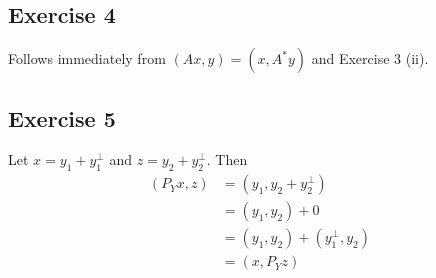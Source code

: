 \subsection{Exercise 4}
Follows immediately from $(Ax, y) = (x, A^{*}y)$ and Exercise 3 (ii).

\subsection{Exercise 5}
Let $x = y_1 + y_1^{\perp}$ and $z = y_2 + y_2^{\perp}$. Then
\begin{align*}
        (P_Y x, z) &= (y_1, y_2 + y_2^{\perp}) \\
                   &= (y_1, y_2) + 0 \\
                   &= (y_1, y_2) + (y_1^{\perp}, y_2) \\
                   &= (x, P_Y z)
\end{align*}

